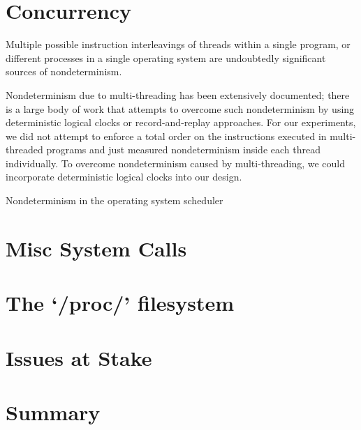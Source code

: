 \section{Concurrency}
Multiple possible instruction interleavings of 
threads within a single program, 
or different processes in 
a single operating system are
undoubtedly significant sources
of nondeterminism.

Nondeterminism due to multi-threading
has been extensively documented; there
is a large body of work that
attempts to overcome such nondeterminism
by using deterministic logical clocks
or record-and-replay approaches. 
For our experiments, we did not attempt to enforce
a total order on the instructions executed in multi-threaded
programs and just measured nondeterminism inside each
thread individually. To
overcome nondeterminism caused
by multi-threading, we could incorporate
deterministic logical clocks 
into our design.

Nondeterminism in the operating system
scheduler 



\section{Misc System Calls}

\section{The `/proc/' filesystem}\label{ch3:procfs}








\section{Issues at Stake}
\section {Summary}
